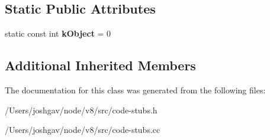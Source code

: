 \subsection*{Static Public Attributes}
\begin{DoxyCompactItemize}
\item 
static const int {\bfseries k\+Object} = 0\hypertarget{classv8_1_1internal_1_1_typeof_stub_ac117753f3f501035a1c0cdf66ff56a11}{}\label{classv8_1_1internal_1_1_typeof_stub_ac117753f3f501035a1c0cdf66ff56a11}

\end{DoxyCompactItemize}
\subsection*{Additional Inherited Members}


The documentation for this class was generated from the following files\+:\begin{DoxyCompactItemize}
\item 
/\+Users/joshgav/node/v8/src/code-\/stubs.\+h\item 
/\+Users/joshgav/node/v8/src/code-\/stubs.\+cc\end{DoxyCompactItemize}
